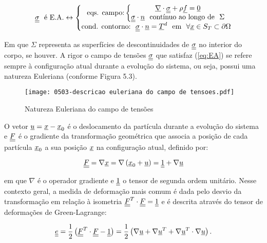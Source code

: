 \begin{equation}
	\label{eq:EA}
	\underline{\underline \sigma}~~ \text{é E.A.} \leftrightarrow \left\{
		\begin{matrix}
			\text{eqs. campo:} \left\{
				\begin{matrix}
					\underline \nabla \cdot \underline{\underline \sigma}+ \rho \underline f = \underline 0 \\ 
					\underline{\underline \sigma} \cdot \underline n ~~ \text{contínuo ao longo de} ~~ \Sigma
		
				\end{matrix}\right. \\ 
			\text{cond. contorno:}~~ \underline{\underline \sigma} \cdot \underline n = \underline T^d ~~ \text{em} ~~ \forall \underline x \in S_T \subset \partial \Omega
		\end{matrix}\right.
\end{equation}

Em que $\Sigma$  representa as superfícies de descontinuidades de $\underline{\underline \sigma}$ no interior do corpo, se houver. A rigor o campo de tensões $\underline{\underline \sigma}$ que satisfaz (\ref{eq:EA}) se refere sempre à configuração atual durante a evolução do sistema, ou seja, possui uma natureza Euleriana (conforme Figura 5.3).

\begin{figure}[H]
	\begin{center}
		\texttt{[image: 0503-descricao euleriana do campo de tensoes.pdf]}
	\end{center}
	\caption{\label{tensoes_Euleriana}Natureza Euleriana do campo de tensões}
\end{figure}

O vetor $\underline u = \underline x - \underline x_0$ é o deslocamento da partícula durante a evolução do sistema e $\underline{\underline F}$ é o gradiente da transformação geométrica que associa a posição de cada partícula $\underline x_0$ a sua posição $\underline x$ na configuração atual, definido por:

\begin{equation}
	\label{eq:transformacao_geometrica}
 	\underline{\underline F} = \nabla \underline x = \nabla \left( \underline x_0+\underline u \right) = \underline{\underline 1} + \nabla \underline u
\end{equation}

em que $\nabla$ é o operador gradiente e $\underline{\underline 1}$ o tensor de segunda ordem unitário. Nesse contexto geral, a medida de deformação mais comum é dada pelo desvio da transformação em relação à isometria $\underline{\underline F}^T \cdot \underline{\underline F} = \underline{\underline 1}$ e é descrita através do tensor de deformações de Green-Lagrange:

\begin{equation}
	\label{eq:green_lagrange}
	\underline{\underline e} = \frac{1}{2} \left(\underline{\underline F}^T \cdot \underline{\underline F} - \underline{\underline 1} \right) = \frac{1}{2} \left(\nabla \underline u + \nabla\underline u^T + \nabla\underline u^T \cdot \nabla \underline u \right).
\end{equation}

